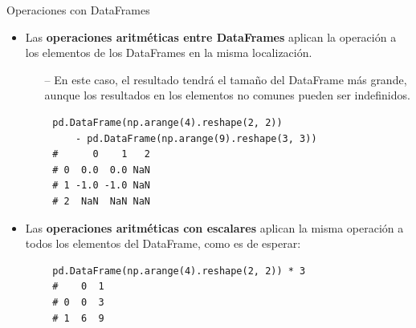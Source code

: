 \documentclass[10pt]{beamer} %
\begin{document}
\begin{frame}[fragile]{Operaciones con DataFrames}
    \begin{itemize}
        \item Las \textbf{operaciones aritméticas entre DataFrames} aplican la operación a los elementos de los DataFrames en la misma localización.
        \begin{itemize}
            \item[--] En este caso, el resultado tendrá el tamaño del DataFrame más grande, aunque los resultados en los elementos no comunes pueden ser indefinidos.
        \end{itemize}
    \end{itemize}
    \begin{verbatim}
        pd.DataFrame(np.arange(4).reshape(2, 2))
            - pd.DataFrame(np.arange(9).reshape(3, 3))
        #      0    1   2
        # 0  0.0  0.0 NaN
        # 1 -1.0 -1.0 NaN
        # 2  NaN  NaN NaN
        \end{verbatim}
    \begin{itemize}
        \item Las \textbf{operaciones aritméticas con escalares} aplican la misma operación a todos los elementos del DataFrame, como es de esperar:
    \end{itemize}
    \begin{verbatim}
        pd.DataFrame(np.arange(4).reshape(2, 2)) * 3
        #    0  1
        # 0  0  3
        # 1  6  9
    \end{verbatim}
\end{frame}
\end{document}
